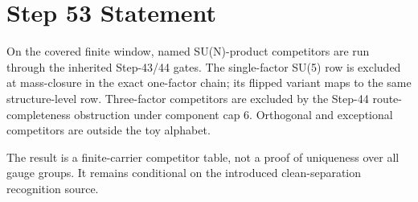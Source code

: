 \documentclass[11pt]{article}
\begin{document}
\section*{Step 53 Statement}
On the covered finite window, named SU(N)-product competitors are run through the inherited Step-43/44 gates. The single-factor SU(5) row is excluded at mass-closure in the exact one-factor chain; its flipped variant maps to the same structure-level row. Three-factor competitors are excluded by the Step-44 route-completeness obstruction under component cap 6. Orthogonal and exceptional competitors are outside the toy alphabet.

The result is a finite-carrier competitor table, not a proof of uniqueness over all gauge groups. It remains conditional on the introduced clean-separation recognition source.
\end{document}
